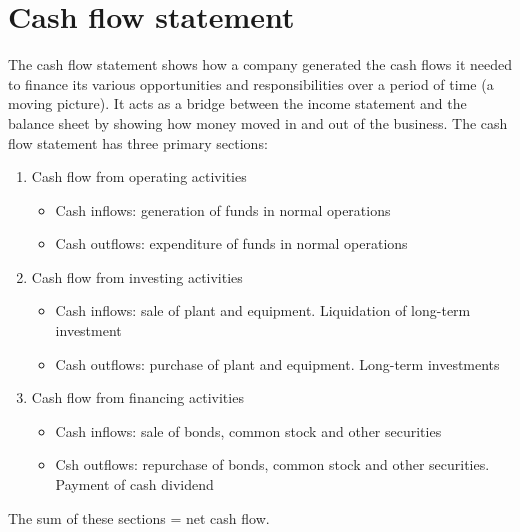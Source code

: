 \section{Cash flow statement}
The cash flow statement shows how a company generated the cash flows it needed to finance its various opportunities and responsibilities over a period of time (a moving picture). It acts as a bridge between the income statement and the balance sheet by showing how money moved in and out of the business. The cash flow statement has three primary sections:
\begin{enumerate}
    \item Cash flow from operating activities
          \begin{itemize}
              \item Cash inflows: generation of funds in normal operations
              \item Cash outflows: expenditure of funds in normal operations
          \end{itemize}
    \item Cash flow from investing activities
          \begin{itemize}
              \item Cash inflows: sale of plant and equipment. Liquidation of long-term investment
              \item Cash outflows: purchase of plant and equipment. Long-term investments
          \end{itemize}
    \item Cash flow from financing activities
          \begin{itemize}
              \item Cash inflows: sale of bonds, common stock and other securities
              \item Csh outflows: repurchase of bonds, common stock and other securities. Payment of cash dividend
          \end{itemize}
\end{enumerate}
The sum of these sections = net cash flow.
